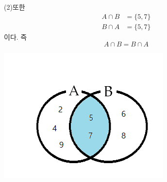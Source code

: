 \documentclass{oblivoir}
\begin{document}
\bigskip\bigskip\noindent
\begin{minipage}{0.65\textwidth}
(2)\:또한
\begin{align*}
A\cap B&=\{5,7\}\\
B\cap A&=\{5,7\}
\end{align*}
이다.
즉
\[A\cap B=B\cap A\]
\end{minipage}
\begin{minipage}{0.3\textwidth}
\begin{center}
\includegraphics[width=\textwidth]{properties_2-2}
\end{center}
\end{minipage}
\end{document}
